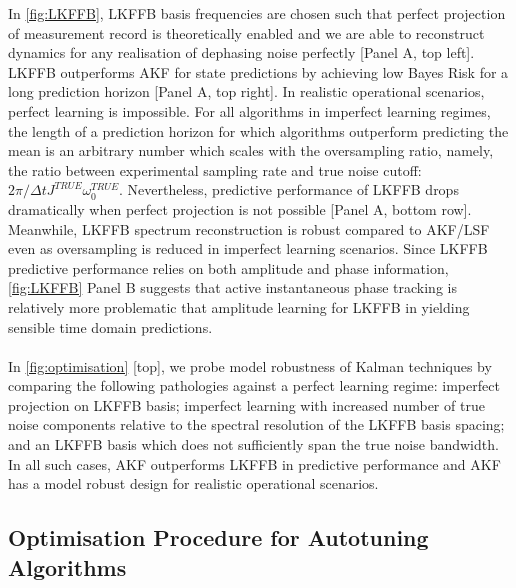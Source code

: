 In \cref{fig:LKFFB}, LKFFB basis frequencies are chosen such that perfect projection of measurement record  is theoretically enabled and we are able to reconstruct dynamics for any realisation of dephasing noise perfectly [Panel A, top left]. LKFFB outperforms AKF for state predictions by achieving low Bayes Risk for a long prediction horizon [Panel A, top right]. In realistic operational scenarios, perfect learning is impossible. For all algorithms in imperfect learning regimes, the length of a prediction horizon for which algorithms outperform predicting the mean is an arbitrary number which scales with the oversampling ratio, namely, the ratio between experimental sampling rate and true noise cutoff: $2 \pi / \Delta t J^{TRUE} \omega_0^{TRUE}$. Nevertheless, predictive performance of LKFFB drops dramatically when perfect projection is not possible [Panel A, bottom row]. Meanwhile, LKFFB spectrum reconstruction is robust compared to AKF/LSF even as oversampling is reduced in imperfect learning scenarios. Since LKFFB predictive performance relies on both amplitude and phase information, \cref{fig:LKFFB} Panel B suggests that active instantaneous phase tracking is relatively more problematic that amplitude learning for LKFFB in yielding sensible time domain predictions.
\\
\\
In \cref{fig:optimisation} [top], we probe model robustness of Kalman techniques by comparing the following pathologies against a perfect learning regime: imperfect projection on LKFFB basis; imperfect learning with increased number of true noise components relative to the spectral resolution of the LKFFB basis spacing; and an LKFFB basis which does not sufficiently span the true noise bandwidth. In all such cases, AKF outperforms LKFFB in predictive performance and AKF has a model robust design for realistic operational scenarios. 

\FloatBarrier
\subsection{Optimisation Procedure for Autotuning Algorithms} \label{sec:main:part4}

